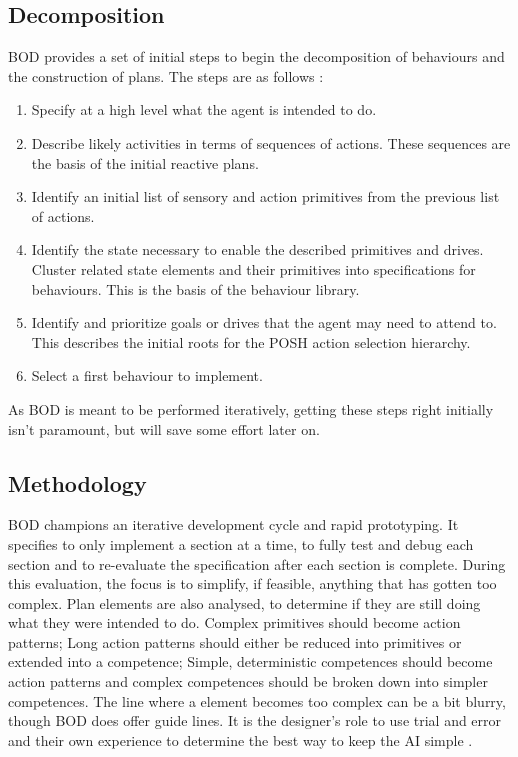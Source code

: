 \documentclass[11pt,openright,a4paper]{report}
\begin{document}
\subsection{Decomposition}
BOD provides a set of initial steps to begin the decomposition of behaviours and the construction of plans. The steps are as follows \cite{bryson2003behavior}:
\begin{enumerate}
\item Specify at a high level what the agent is intended to do.
\item Describe likely activities in terms of sequences of actions. These sequences are the basis of the initial reactive plans.
\item Identify an initial list of sensory and action primitives from the previous list of actions.
\item Identify the state necessary to enable the described primitives and drives. Cluster related state elements and their primitives into specifications for behaviours. This is the basis of the behaviour library.
\item Identify and prioritize goals or drives that the agent may need to attend to. This describes the initial roots for the POSH action selection hierarchy.
\item Select a first behaviour to implement.
\end{enumerate}
As BOD is meant to be performed iteratively, getting these steps right initially isn't paramount, but will save some effort later on.

\subsection{Methodology}
BOD champions an iterative development cycle and rapid prototyping. It specifies to only implement a section at a time, to fully test and debug each section and to re-evaluate the specification after each section is complete. During this evaluation, the focus is to simplify, if feasible, anything that has gotten too complex. Plan elements are also analysed, to determine if they are still doing what they were intended to do. Complex primitives should become action patterns; Long action patterns should either be reduced into primitives or extended into a competence; Simple, deterministic competences should become action patterns and complex competences should be broken down into simpler competences. The line where a element becomes too complex can be a bit blurry, though BOD does offer guide lines. It is the designer's role to use trial and error and their own experience to determine the best way to keep the AI simple \cite{bryson2003behavior}.
\end{document}
